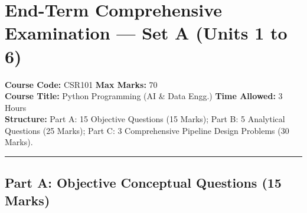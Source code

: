 \section{End-Term Comprehensive Examination --- Set A (Units 1 to 6)}
\noindent\textbf{Course Code:} CSR101 \hfill \textbf{Max Marks:} 70\\
\textbf{Course Title:} Python Programming (AI \& Data Engg.) \hfill \textbf{Time Allowed:} 3 Hours\\
\textbf{Structure:} Part A: 15 Objective Questions (15 Marks); Part B: 5 Analytical Questions (25 Marks); Part C: 3 Comprehensive Pipeline Design Problems (30 Marks).
\vspace{4mm}
\hrule
\vspace{4mm}

\subsection*{Part A: Objective Conceptual Questions (15 Marks)}
